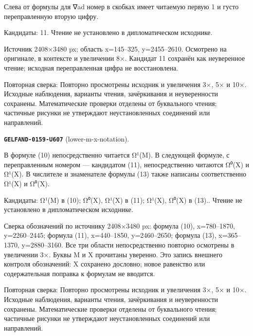 Слева от формулы для ∇ad номер в скобках имеет читаемую первую 1 и густо переправленную вторую цифру.\par
Кандидаты: 11. Чтение не установлено в дипломатическом исходнике.\par
Источник 2408×3480 px; область x=145–325, y=2455–2610. Осмотрено на оригинале, в контексте и увеличении 8×. Кандидат 11 сохранён как неуверенное чтение; исходная переправленная цифра не восстановлена.\par
Повторная сверка: Повторно просмотрены исходник и увеличения 3×, 5× и 10×. Исходные наблюдения, варианты чтения, зачёркивания и неуверенности сохранены. Математические проверки отделены от буквального чтения; частичные рисунки не утверждают неустановленных соединений или направлений.\par\medskip
\par\noindent\leavevmode{}\label{GELFAND-0159-U607}\label{GELFAND-P001474:lower-m-x-notation}\textbf{\texttt{GELFAND-0159-U607}} (lower-m-x-notation).\nopagebreak[4]\par
В формуле (10) непосредственно читается Ω¹(M). В следующей формуле, с переправленным номером — кандидатом (11), непосредственно читаются Ω⁰(X) и Ω¹(X). В числителе и знаменателе формулы (13) также написаны соответственно Ω¹(X) и Ω⁰(X).\par
Кандидаты: Ω¹(M) в (10); Ω⁰(X), Ω¹(X) в (11); Ω¹(X), Ω⁰(X) в (13).. Чтение не установлено в дипломатическом исходнике.\par
Сверка обозначений по источнику 2408×3480 px: формула (10), x=780–1870, y=2260–2445; формула (11), x=440–1850, y=2460–2650; формула (13), x=365–1370, y=2880–3160. Все три области непосредственно повторно осмотрены в увеличении 3×. Буквы M и X прочитаны уверенно. Это запись внешнего контроля обозначений: X сохранено дословно; новое равенство или содержательная поправка к формулам не вводится.\par
Повторная сверка: Повторно просмотрены исходник и увеличения 3×, 5× и 10×. Исходные наблюдения, варианты чтения, зачёркивания и неуверенности сохранены. Математические проверки отделены от буквального чтения; частичные рисунки не утверждают неустановленных соединений или направлений.\par\medskip
